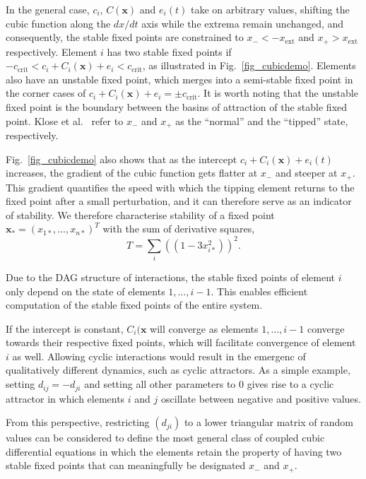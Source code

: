 \documentclass[conference]{IEEEtran}
\newcommand{\vectorsym}[1]{\ensuremath{\mathbf{#1}}}
\newcommand{\xextremum}{\ensuremath{x_{\mathrm{ext}}}}
\newcommand{\ccrit}{\ensuremath{c_{\mathrm{crit}}}}
\newcommand{\agentimpact}{\ensuremath{e}}
\newcommand{\couplingconstant}{\ensuremath{d}}
\newcommand{\couplingfunction}{\ensuremath{C}}
\newcommand{\sumderivsquares}{\ensuremath{T}}
\begin{document}
In the general case, $c_i$, $C(\vectorsym{x})$ and $\agentimpact_i(t)$
take on arbitrary values, shifting the cubic function along the
$dx / dt$ axis while the extrema remain unchanged, and consequently,
the stable fixed points are constrained to $x_{-} < -\xextremum$ and
$x_{+} > \xextremum$ respectively. Element $i$ has two stable fixed
points if
$-\ccrit < c_i + \couplingfunction_i(\vectorsym{x}) + \agentimpact_i <
\ccrit$,
as illustrated in Fig.~\ref{fig_cubicdemo}. Elements also have an
unstable fixed point, which merges into a semi-stable fixed point in
the corner cases of
$c_i + \couplingfunction_i(\vectorsym{x}) + \agentimpact_i = \pm
\ccrit$.
It is worth noting that the unstable fixed point is the boundary
between the basins of attraction of the stable fixed point. Klose et
al.\ \cite{Klose2019_interactingtippingelements} refer to $x_{-}$ and
$x_{+}$ as the ``normal'' and the ``tipped'' state, respectively.

Fig.~\ref{fig_cubicdemo} also shows that as the intercept
$c_i + \couplingfunction_i(\vectorsym{x}) + \agentimpact_i(t)$
increases, the gradient of the cubic function gets flatter at $x_{-}$
and steeper at $x_{+}$. This gradient quantifies the speed with which
the tipping element returns to the fixed point after a small
perturbation, and it can therefore serve as an indicator of stability.
We therefore characterise stability of a fixed point
$\vectorsym{x}_* = (x_{1*}, \ldots, x_{n*})^T$ with the sum of
derivative squares,
\begin{equation}
  \label{eq_dss}
  \sumderivsquares = \sum_i ((1 - 3 x_{i*}^2))^2.
\end{equation}

Due to the DAG structure of interactions, the stable fixed points of
element $i$ only depend on the state of elements $1, \ldots, i - 1$.
This enables efficient computation of the stable fixed points of the
entire system.

If the intercept is constant, $\couplingfunction_i(\vectorsym{x}$ will converge as
elements $1, \ldots, i - 1$ converge towards their respective fixed
points, which will facilitate convergence of element $i$ as well.
Allowing cyclic interactions would result in the emergenc of
qualitatively different dynamics, such as cyclic attractors. As a
simple example, setting $\couplingconstant_{ij} = -\couplingconstant_{ji}$ and setting all other
parameters to $0$ gives rise to a cyclic attractor in which elements
$i$ and $j$ oscillate between negative and positive values.

From this perspective, restricting $(\couplingconstant_{ji})$ to a lower triangular
matrix of random values can be considered to define the most general
class of coupled cubic differential equations in which the elements
retain the property of having two stable fixed points that can
meaningfully be designated $x_{-}$ and $x_{+}$.
\end{document}
